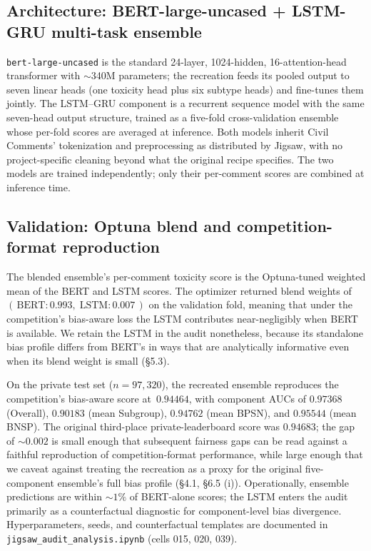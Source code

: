 \documentclass[11pt]{article}
\begin{document}
\subsection{Architecture: BERT-large-uncased + LSTM-GRU multi-task ensemble}

\texttt{bert-large-uncased} is the standard 24-layer, 1024-hidden, 16-attention-head transformer with $\sim$340M parameters; the recreation feeds its pooled output to seven linear heads (one toxicity head plus six subtype heads) and fine-tunes them jointly. The LSTM--GRU component is a recurrent sequence model with the same seven-head output structure, trained as a five-fold cross-validation ensemble whose per-fold scores are averaged at inference. Both models inherit Civil Comments' tokenization and preprocessing as distributed by Jigsaw, with no project-specific cleaning beyond what the original recipe specifies. The two models are trained independently; only their per-comment scores are combined at inference time.

\subsection{Validation: Optuna blend and competition-format reproduction}

The blended ensemble's per-comment toxicity score is the Optuna-tuned weighted mean of the BERT and LSTM scores. The optimizer returned blend weights of $(\,\text{BERT}: 0.993,\; \text{LSTM}: 0.007\,)$ on the validation fold, meaning that under the competition's bias-aware loss the LSTM contributes near-negligibly when BERT is available. We retain the LSTM in the audit nonetheless, because its standalone bias profile differs from BERT's in ways that are analytically informative even when its blend weight is small (\S5.3).

On the private test set ($n = 97{,}320$), the recreated ensemble reproduces the competition's bias-aware score at~$0.94464$, with component AUCs of $0.97368$ (Overall), $0.90183$ (mean Subgroup), $0.94762$ (mean BPSN), and $0.95544$ (mean BNSP). The original third-place private-leaderboard score was $0.94683$; the gap of $\sim 0.002$ is small enough that subsequent fairness gaps can be read against a faithful reproduction of competition-format performance, while large enough that we caveat against treating the recreation as a proxy for the original five-component ensemble's full bias profile (\S4.1, \S6.5 (i)). Operationally, ensemble predictions are within $\sim 1\%$ of BERT-alone scores; the LSTM enters the audit primarily as a counterfactual diagnostic for component-level bias divergence. Hyperparameters, seeds, and counterfactual templates are documented in \texttt{jigsaw\_audit\_analysis.ipynb} (cells 015, 020, 039).
\end{document}
